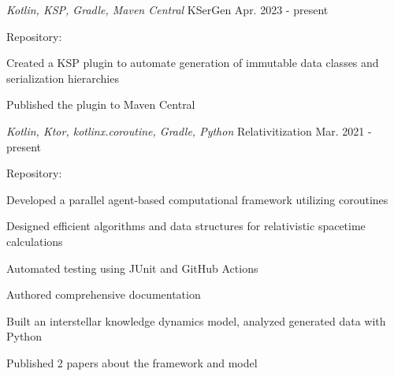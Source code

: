 

\begin{cventries}

  \cventry
    {\emph{Kotlin, KSP, Gradle, Maven Central}} %
    {KSerGen} %
    {} %
    {Apr. 2023 - present} %
    {
      \begin{cvitems} %
        \item{Repository: \href{https://github.com/adriankhl/ksergen}{\underline{}}}
        \item{Created a KSP plugin to automate generation of immutable data classes and serialization hierarchies}
        \item{Published the plugin to Maven Central}
      \end{cvitems}
    }

  \cventry
    {\emph{Kotlin, Ktor, kotlinx.coroutine, Gradle, Python}} %
    {Relativitization} %
    {} %
    {Mar. 2021 - present} %
    {
      \begin{cvitems} %
        \item{Repository: \href{https://github.com/adriankhl/relativitization}{\underline{}}}
        \item{Developed a parallel agent-based computational framework utilizing coroutines}
        \item{Designed efficient algorithms and data structures for relativistic spacetime calculations}
        \item{Automated testing using JUnit and GitHub Actions}
        \item{Authored comprehensive documentation}
        \item{Built an interstellar knowledge dynamics model, analyzed generated data with Python}
        \item{Published 2 papers about the framework and model}
      \end{cvitems}
    }


\end{cventries}
